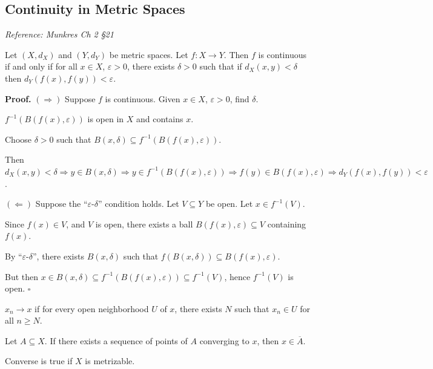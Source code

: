 \documentclass[11pt]{report}
\renewenvironment{proof}[1][Proof]{\noindent\textbf{#1.} }{\hfill$\square$\par\vspace{5pt}}
\begin{document}
\subsection{Continuity in Metric Spaces}

\textit{Reference: Munkres Ch 2 \S 21}

\begin{thmbox}
Let $(X, d_X)$ and $(Y, d_Y)$ be metric spaces. Let $f: X \to Y$. Then $f$ is continuous if and only if for all $x \in X$, $\varepsilon > 0$, there exists $\delta > 0$ such that if $d_X(x, y) < \delta$ then $d_Y(f(x), f(y)) < \varepsilon$.
\end{thmbox}

\begin{proof}
$(\Rightarrow)$ Suppose $f$ is continuous. Given $x \in X$, $\varepsilon > 0$, find $\delta$.

$f^{-1}(B(f(x), \varepsilon))$ is open in $X$ and contains $x$.

Choose $\delta > 0$ such that $B(x, \delta) \subseteq f^{-1}(B(f(x), \varepsilon))$.

Then $d_X(x, y) < \delta \Rightarrow y \in B(x, \delta) \Rightarrow y \in f^{-1}(B(f(x), \varepsilon)) \Rightarrow f(y) \in B(f(x), \varepsilon) \Rightarrow d_Y(f(x), f(y)) < \varepsilon$.

$(\Leftarrow)$ Suppose the ``$\varepsilon$-$\delta$'' condition holds. Let $V \subseteq Y$ be open. Let $x \in f^{-1}(V)$.

Since $f(x) \in V$, and $V$ is open, there exists a ball $B(f(x), \varepsilon) \subseteq V$ containing $f(x)$.

By ``$\varepsilon$-$\delta$'', there exists $B(x, \delta)$ such that $f(B(x, \delta)) \subseteq B(f(x), \varepsilon)$.

But then $x \in B(x, \delta) \subseteq f^{-1}(B(f(x), \varepsilon)) \subseteq f^{-1}(V)$, hence $f^{-1}(V)$ is open.
\end{proof}

\begin{rembox}
$x_n \to x$ if for every open neighborhood $U$ of $x$, there exists $N$ such that $x_n \in U$ for all $n \geq N$.
\end{rembox}

\begin{lembox}
Let $A \subseteq X$. If there exists a sequence of points of $A$ converging to $x$, then $x \in \overline{A}$.

Converse is true if $X$ is metrizable.
\end{lembox}
\end{document}
